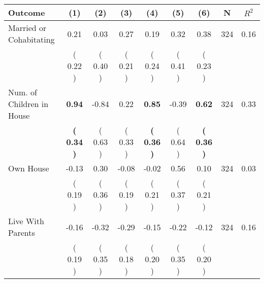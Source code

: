 \begin{tabular}{lcccccccc}
\toprule
 \textbf{Outcome} & \textbf{(1)} & \textbf{(2)} & \textbf{(3)} & \textbf{(4)} & \textbf{(5)} & \textbf{(6)} & \textbf{N} & \textbf{$ R^2$} \\
\midrule
Married or Cohabitating &      0.21 &      0.03 &      0.27 &      0.19 &      0.32 &      0.38 & 324 &       0.16 \\ 
 & (     0.22 ) & (     0.40 ) & (     0.21 ) & (     0.24 ) & (     0.41 ) & (     0.23 ) & \\
Num. of Children in House & \textbf{     0.94} &     -0.84 &      0.22 & \textbf{     0.85} &     -0.39 & \textbf{     0.62} & 324 &       0.33 \\ 
 & \textbf{(     0.34 )} & (     0.63 ) & (     0.33 ) & \textbf{(     0.36 )} & (     0.64 ) & \textbf{(     0.36 )} & \\
Own House &     -0.13 &      0.30 &     -0.08 &     -0.02 &      0.56 &      0.10 & 324 &       0.03 \\ 
 & (     0.19 ) & (     0.36 ) & (     0.19 ) & (     0.21 ) & (     0.37 ) & (     0.21 ) & \\
Live With Parents &     -0.16 &     -0.32 &     -0.29 &     -0.15 &     -0.22 &     -0.12 & 324 &       0.16 \\ 
 & (     0.19 ) & (     0.35 ) & (     0.18 ) & (     0.20 ) & (     0.35 ) & (     0.20 ) & \\
\bottomrule
\end{tabular}
